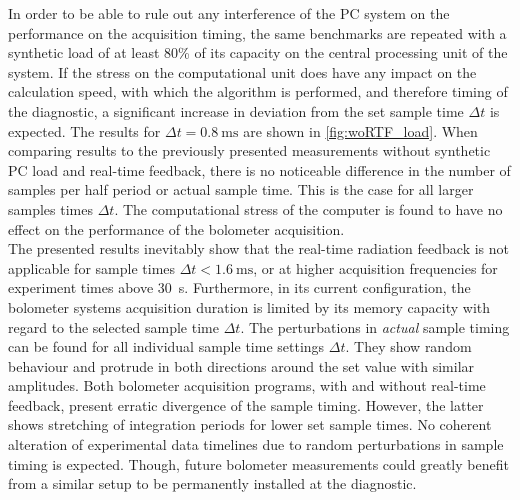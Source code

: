 %
            In order to be able to rule out any interference of the PC system on the performance on the acquisition timing, the same benchmarks are repeated with a synthetic load of at least 80\% of its capacity on the central processing unit of the system. If the stress on the computational unit does have any impact on the calculation speed, with which the algorithm is performed, and therefore timing of the diagnostic, a significant increase in deviation from the set sample time $\Delta t$ is expected. The results for $\Delta t=\SI{0.8}{\milli\second}$ are shown in \cref{fig:woRTF_load}. When comparing results to the previously presented measurements without synthetic PC load and real-time feedback, there is no noticeable difference in the number of samples per half period or actual sample time. This is the case for all larger samples times $\Delta t$. The computational stress of the computer is found to have no effect on the performance of the bolometer acquisition.\\%
            The presented results inevitably show that the real-time radiation feedback is not applicable for sample times $\Delta t<\SI{1.6}{\milli\second}$, or at higher acquisition frequencies for experiment times above \SI{30}{\second}. Furthermore, in its current configuration, the bolometer systems acquisition duration is limited by its memory capacity with regard to the selected sample time $\Delta t$. The perturbations in \textit{actual} sample timing can be found for all individual sample time settings $\Delta t$. They show random behaviour and protrude in both directions around the set value with similar amplitudes. Both bolometer acquisition programs, with and without real-time feedback, present erratic divergence of the sample timing. However, the latter shows stretching of integration periods for lower set sample times. No coherent alteration of experimental data timelines due to random perturbations in sample timing is expected. Though, future bolometer measurements could greatly benefit from a similar setup to be permanently installed at the diagnostic.\\%
%
